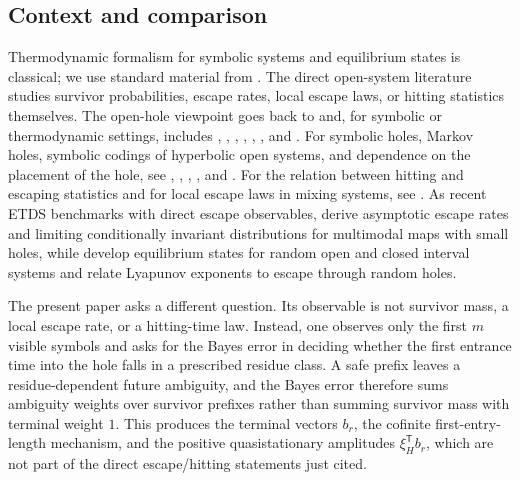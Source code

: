 \subsection*{Context and comparison}

Thermodynamic formalism for symbolic systems and equilibrium states is
classical; we use standard material from
\citet{Bowen2008,Ruelle1978,Walters1975GMeasures,WaltersErgodicTheory}.
The direct open-system literature studies survivor probabilities,
escape rates, local escape laws, or hitting statistics themselves.  The
open-hole viewpoint goes back to \citet{PianigianiYorke1979} and, for
symbolic or thermodynamic settings, includes
\citet{ColletMartinezSchmitt1997}, \citet{DemersYoung2006},
\citet{KellerLiverani2009}, \citet{DemersWrightYoung2012},
\citet{FergusonPollicott2012}, \citet{DemersTodd2017}, and
\citet{BruinDemers2022}.  For symbolic holes, Markov holes, symbolic
codings of hyperbolic open systems, and dependence on the placement of
the hole, see \citet{BundfussKrugerTroubetzkoy2011},
\citet{BunimovichYurchenko2011}, \citet{CheriyathAgarwal2023},
\citet{BonannoCristadoroLenci2022}, and
\citet{AgarwalCheriyathTikekar2024}.  For the relation between hitting
and escaping statistics and for local escape laws in mixing systems, see
\citet{BruinDemersTodd2018,HaydnYang2020}.  As recent ETDS benchmarks
with direct escape observables, \citet{DemersTodd2021} derive
asymptotic escape rates and limiting conditionally invariant
distributions for multimodal maps with small holes, while
\citet{AtnipFroylandGonzalezTokmanVaienti2023} develop equilibrium
states for random open and closed interval systems and relate Lyapunov
exponents to escape through random holes.

The present paper asks a different question.  Its observable is not
survivor mass, a local escape rate, or a hitting-time law.  Instead, one
observes only the first \(m\) visible symbols and asks for the Bayes
error in deciding whether the first entrance time into the hole falls in
a prescribed residue class.  A safe prefix leaves a residue-dependent
future ambiguity, and the Bayes error therefore sums ambiguity weights
over survivor prefixes rather than summing survivor mass with terminal
weight \(1\).  This produces the terminal vectors \(b_r\), the
cofinite first-entry-length mechanism, and the positive quasistationary
amplitudes \(\xi_H^{\mathsf T}b_r\), which are not part of the direct
escape/hitting statements just cited.


